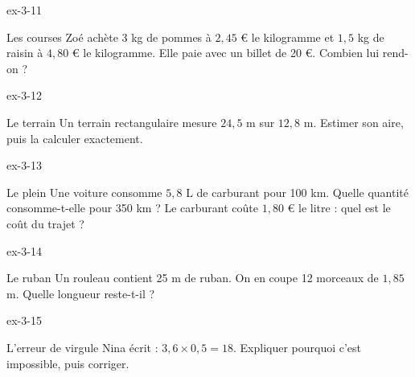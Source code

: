 \begin{blocLivre}{ex-3-11}\begin{exercice}[3]{Les courses}
Zoé achète 3 kg de pommes à $2{,}45$ € le kilogramme et $1{,}5$ kg de raisin à $4{,}80$ € le kilogramme. Elle paie avec un billet de 20 €. Combien lui rend-on ?
\end{exercice}\end{blocLivre}
\begin{blocLivre}{ex-3-12}\begin{exercice}[3]{Le terrain}
Un terrain rectangulaire mesure $24{,}5$ m sur $12{,}8$ m. Estimer son aire, puis la calculer exactement.
\end{exercice}\end{blocLivre}
\begin{blocLivre}{ex-3-13}\begin{exercice}[3]{Le plein}
Une voiture consomme $5{,}8$ L de carburant pour 100 km. Quelle quantité consomme-t-elle pour 350 km ? Le carburant coûte $1{,}80$ € le litre : quel est le coût du trajet ?
\end{exercice}\end{blocLivre}
\begin{blocLivre}{ex-3-14}\begin{exercice}[3]{Le ruban}
Un rouleau contient 25 m de ruban. On en coupe 12 morceaux de $1{,}85$ m. Quelle longueur reste-t-il ?
\end{exercice}\end{blocLivre}
\begin{blocLivre}{ex-3-15}\begin{exercice}[3]{L’erreur de virgule}
Nina écrit : $3{,}6\times0{,}5=18$. Expliquer pourquoi c’est impossible, puis corriger.
\end{exercice}\end{blocLivre}

\clearpage
